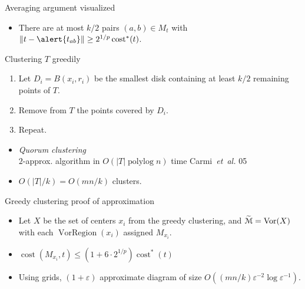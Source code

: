 \documentclass[xcolor={dvipsnames,usenames},handout]{beamer} %
\newcommand{\mycite}[1]{{\color{violet}\lbrack #1\rbrack}}
\newcommand{\etal}{\textit{et~al.}}
\newcommand{\eps}{\varepsilon}
\DeclareMathOperator{\polylog}{polylog}
\DeclareMathOperator{\Vor}{Vor}
\DeclareMathOperator{\VorRegion}{VorRegion}
\def\abs#1{\mathopen| #1 \mathclose|}		%
\def\norm#1{\mathopen\| #1 \mathclose\|}	%
\DeclareMathOperator{\cost}{cost}
\newcommand{\tildeM}{\widetilde{\EuScript{M}}}
\def\EMPH#1{\textcolor{BrickRed}{{\emph{#1}}}}
\begin{document}
\begin{frame}{Averaging argument visualized}
\begin{itemize}
\item There are at most $k/2$ pairs $(a, b) \in M_t$ with $\norm{t-\alert{t_{ab}}} \geq 2^{1/p}\cost^*(t)$.
\end{itemize}
\end{frame}

\begin{frame}{Clustering $T$ greedily}
\begin{enumerate}
\item Let $D_i = B(x_i, r_i)$ be the smallest disk containing at least $k/2$ remaining points of $T$.
\item Remove from $T$ the points covered by $D_i$.
\item Repeat.
\end{enumerate}
\begin{itemize}
\item \EMPH{Quorum clustering}\\
	$2$-approx. algorithm in $O(\abs{T}\polylog n)$ time \mycite{Carmi~{\etal} 05}
\item $O(\abs{T}/k) = O(mn/k)$ clusters.
\end{itemize}
\end{frame}

\begin{frame}{Greedy clustering proof of approximation}
\begin{itemize}
\item Let $X$ be the set of centers $x_i$ from the greedy clustering,
	and $\tildeM = \Vor(X)$ with each $\VorRegion(x_i)$ assigned $M_{x_i}$.
\end{itemize}
\begin{itemize}
\item $\cost(M_{x_i}, t) \leq (1+6\cdot 2^{1/p}) \cost^*(t)$
\item Using grids, $(1+\eps)$ approximate diagram of size
	$O((mn/k) \eps^{-2}\log \eps^{-1})$.
\end{itemize}
\end{frame}
\end{document}
